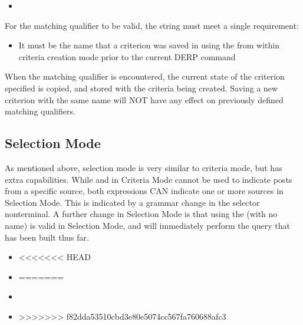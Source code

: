\begin{itemize}[leftmargin=2in]
    \item[\nonterminal{qualifier}] \bnf{:}  
\end{itemize}

For the matching qualifier to be valid, the string must meet a single requirement:
\begin{itemize}
\item It must be the name that a criterion was saved in using the  from within criteria creation mode prior to the current DERP command
\end{itemize}
When the matching qualifier is encountered, the current state of the criterion specified is copied, and stored with the criteria being created.
Saving a new criterion with the same name will NOT have any effect on previously defined matching qualifiers.

\subsection{Selection Mode}\label{Selection_Mode}
As mentioned above, selection mode is very similar to criteria mode, but has extra capabilities. While  and  in Criteria Mode
cannot be used to indicate posts from a specific source, both expressions CAN indicate one or more sources in Selection Mode. This is indicated by a grammar
change in the selector nonterminal. A further change in Selection Mode is that using the  (with no  name) is valid in Selection Mode, and will immediately perform the query that has been built thus far.

\begin{itemize}[leftmargin=2in]
    \item[\nonterminal{selector}] \bnf{:}  \bnf{|}  
<<<<<<< HEAD
    \item[\nonterminal{source}] \bnf{:}  \bnf{(}  \bnf{|}  \bnf{)} 
=======
    \item[\nonterminal{source}] \bnf{:}  \bnf{(}  \bnf{|}  \bnf{)} 
    \item[\nonterminal{read\_expression}] \bnf{:} 
>>>>>>> f82dda53510cbd3e80e5074cc567fa760688afc3
\end{itemize}

